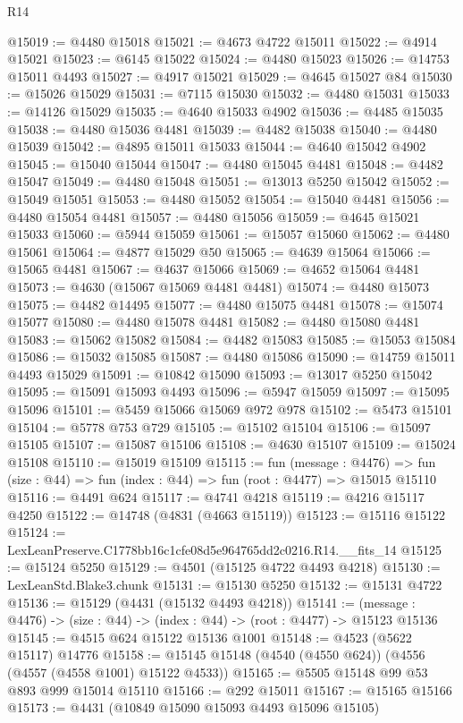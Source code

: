 \begin{lexlean}{R14}
\begin{coremodule}
@15019 := @4480 @15018
@15021 := @4673 @4722 @15011
@15022 := @4914 @15021
@15023 := @6145 @15022
@15024 := @4480 @15023
@15026 := @14753 @15011 @4493
@15027 := @4917 @15021
@15029 := @4645 @15027 @84
@15030 := @15026 @15029
@15031 := @7115 @15030
@15032 := @4480 @15031
@15033 := @14126 @15029
@15035 := @4640 @15033 @4902
@15036 := @4485 @15035
@15038 := @4480 @15036 @4481
@15039 := @4482 @15038
@15040 := @4480 @15039
@15042 := @4895 @15011 @15033
@15044 := @4640 @15042 @4902
@15045 := @15040 @15044
@15047 := @4480 @15045 @4481
@15048 := @4482 @15047
@15049 := @4480 @15048
@15051 := @13013 @5250 @15042
@15052 := @15049 @15051
@15053 := @4480 @15052
@15054 := @15040 @4481
@15056 := @4480 @15054 @4481
@15057 := @4480 @15056
@15059 := @4645 @15021 @15033
@15060 := @5944 @15059
@15061 := @15057 @15060
@15062 := @4480 @15061
@15064 := @4877 @15029 @50
@15065 := @4639 @15064
@15066 := @15065 @4481
@15067 := @4637 @15066
@15069 := @4652 @15064 @4481
@15073 := @4630 (@15067 @15069 @4481 @4481)
@15074 := @4480 @15073
@15075 := @4482 @14495
@15077 := @4480 @15075 @4481
@15078 := @15074 @15077
@15080 := @4480 @15078 @4481
@15082 := @4480 @15080 @4481
@15083 := @15062 @15082
@15084 := @4482 @15083
@15085 := @15053 @15084
@15086 := @15032 @15085
@15087 := @4480 @15086
@15090 := @14759 @15011 @4493 @15029
@15091 := @10842 @15090
@15093 := @13017 @5250 @15042
@15095 := @15091 @15093 @4493
@15096 := @5947 @15059
@15097 := @15095 @15096
@15101 := @5459 @15066 @15069 @972 @978
@15102 := @5473 @15101
@15104 := @5778 @753 @729
@15105 := @15102 @15104
@15106 := @15097 @15105
@15107 := @15087 @15106
@15108 := @4630 @15107
@15109 := @15024 @15108
@15110 := @15019 @15109
@15115 := fun (message : @4476) =>
  fun (size : @44) => fun (index : @44) => fun (root : @4477) => @15015 @15110
@15116 := @4491 @624
@15117 := @4741 @4218
@15119 := @4216 @15117 @4250
@15122 := @14748 (@4831 (@4663 @15119))
@15123 := @15116 @15122
@15124 := LexLeanPreserve.C1778bb16c1cfe08d5e964765dd2c0216.R14.__fits_14
@15125 := @15124 @5250
@15129 := @4501 (@15125 @4722 @4493 @4218)
@15130 := LexLeanStd.Blake3.chunk
@15131 := @15130 @5250
@15132 := @15131 @4722
@15136 := @15129 (@4431 (@15132 @4493 @4218))
@15141 := (message : @4476) -> (size : @44) -> (index : @44) -> (root : @4477) -> @15123 @15136
@15145 := @4515 @624 @15122 @15136 @1001
@15148 := @4523 (@5622 @15117) @14776
@15158 := @15145 @15148 (@4540 (@4550 @624)) (@4556 (@4557 (@4558 @1001) @15122 @4533))
@15165 := @5505 @15148 @99 @53 @893 @999 @15014 @15110
@15166 := @292 @15011
@15167 := @15165 @15166
@15173 := @4431 (@10849 @15090 @15093 @4493 @15096 @15105)

\end{coremodule}
\end{lexlean}
